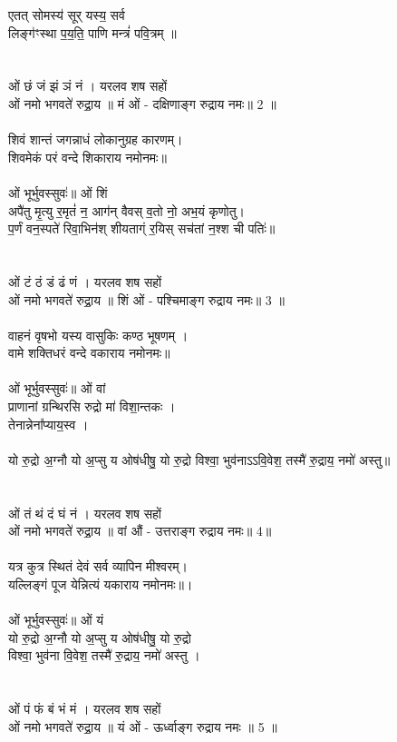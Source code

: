 एतत्  सोमस्य॑ सूर् यस्य॒ सर्व\\
लिङ्ग॑ꣳस्था प॒य॒ति॒ पाणि मन्त्रं॑ पवि॒त्रम् ॥\\
\\
{\small{}}\\
ओं छं जं झं ञं नं । {\small यरलव शष सहों}\\
ओं नमो भगवते॑ रुद्रा॒य ॥ मं ओं - दक्षिणाङ्ग रुद्राय नमः॥ 2 ॥\\
\\
शिवं शान्तं जगन्नाधं लोकानुग्रह कारणम्।\\
शिवमेकं परं वन्दे शिकाराय नमोनमः॥\\
\\
ओं भूर्भुवस्सुवः॑॥ ओं शिं \\
अपै॑तु मृ॒त्यु र॒मृतं॑ न॒ आग॑न् वैवस् व॒तो नो॒ अभ॒यं कृणोतु।\\
प॒र्णं वन॒स्पते॑ रिवा॒भिन॑श् शीयताग्ं र॒यिस् सच॑तां न॒श्श ची पतिः॑॥\\
\\
{\small{}}\\
ओं  टं ठं डं ढं णं । {\small यरलव शष सहों}\\
ओं नमो भगवते॑ रुद्रा॒य ॥ शिं ओं - पश्चिमाङ्ग रुद्राय नमः॥ 3 ॥ \\
\\
वाहनं वृषभो यस्य वासुकिः कण्ठ भूषणम् ।\\
वामे शक्तिधरं वन्दे वकाराय नमोनमः॥\\
\\
ओं भूर्भुवस्सुवः॑॥ ओं वां \\
प्राणानां ग्रन्थिरसि रुद्रो मा॑ विशा॒न्तकः ।\\
तेनान्नेना᳚प्याय॒स्व ।\\
\\
{\small{} यो रु॒द्रो अ॒ग्नौ यो अ॒प्सु य ओष॑धीषु॒ यो
रु॒द्रो विश्वा॒ भुव॑नाऽऽवि॒वेश॒ तस्मै॑ रु॒द्राय॒ नमो॑ अस्तु॥\\
}
\\
{\small{}}\\
ओं  तं थं दं घं नं । {\small यरलव शष सहों}\\
ओं नमो भगवते॑ रुद्रा॒य ॥ वां औं - उत्तराङ्ग रुद्राय नमः॥ 4॥\\
\\
यत्र कुत्र स्थितं देवं सर्व व्यापिन मीश्वरम्।\\
यल्लिङ्गं पूज येन्नित्यं यकाराय नमोनमः॥।\\
\\
ओं भूर्भुवस्सुवः॑॥ ओं यं\\
यो रु॒द्रो अ॒ग्नौ यो अ॒प्सु य ओष॑धीषु॒ यो रु॒द्रो\\
विश्वा॒ भुव॑ना वि॒वेश॒ तस्मै॑ रु॒द्राय॒ नमो॑ अस्तु ।\\
\\
{\small{}}\\
ओं पं फं बं भं मं । {\small यरलव शष सहों}\\
ओं नमो भगवते॑ रुद्रा॒य ॥ यं ओं - ऊर्ध्वाङ्ग रुद्राय नमः ॥ 5 ॥\\
